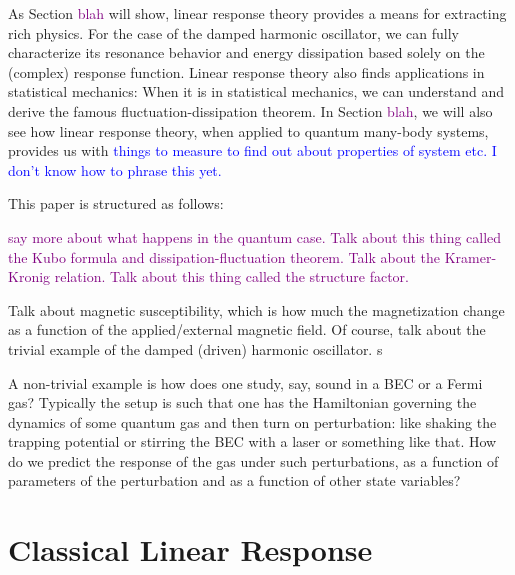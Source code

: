 \documentclass[reprint,
nofootinbib,
amsmath,amssymb,
aps]{revtex4-1}
\begin{document}
As Section \textcolor{purple}{blah} will show, linear response theory provides a means for extracting rich physics. For the case of the damped harmonic oscillator, we can fully characterize its resonance behavior and energy dissipation based solely on the (complex) response function. Linear response theory also finds applications in statistical mechanics: When it is in statistical mechanics, we can understand and derive the famous fluctuation-dissipation theorem. In Section \textcolor{purple}{blah}, we will also see how linear response theory, when applied to quantum many-body systems, provides us with \textcolor{blue}{things to measure to find out about properties of system etc. I don't know how to phrase this yet.}



This paper is structured as follows: 

\textcolor{purple}{say more about what happens in the quantum case. Talk about this thing called the Kubo formula and dissipation-fluctuation theorem. Talk about the Kramer-Kronig relation. Talk about this thing called the structure factor.}

Talk about magnetic susceptibility, which is how much the magnetization change as a function of the applied/external magnetic field. Of course, talk about the trivial example of the damped (driven) harmonic oscillator. s

A non-trivial example is how does one study, say, sound in a BEC or a Fermi gas? Typically the setup is such that one has the Hamiltonian governing the dynamics of some quantum gas and then turn on perturbation: like shaking the trapping potential or stirring the BEC with a laser or something like that. How do we predict the response of the gas under such perturbations, as a function of parameters of the perturbation and as a function of other state variables? 



\section{Classical Linear Response}

%
\end{document}
